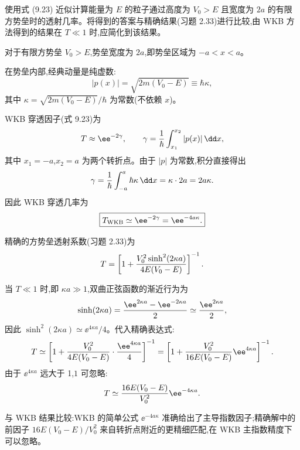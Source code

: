 \begin{question}
使用式 (9.23) 近似计算能量为 $E$ 的粒子通过高度为 $V_0>E$ 且宽度为 $2a$ 的有限方势垒时的透射几率。将得到的答案与精确结果(习题 2.33)进行比较,由 WKB 方法得到的结果在 $T\ll1$ 时,应简化到该结果。

\par\smallskip
{}

\begin{solution}
对于有限方势垒 $V_0>E$,势垒宽度为 $2a$,即势垒区域为 $-a<x<a$。

在势垒内部,经典动量是纯虚数:
\[
|p(x)|=\sqrt{2m(V_0-E)}\equiv\hbar\kappa,
\]
其中 $\kappa=\sqrt{2m(V_0-E)}/\hbar$ 为常数(不依赖 $x$)。

WKB 穿透因子(式 9.23)为
\[
T\approx \ee^{-2\gamma},
\qquad
\gamma={1\over\hbar}\int_{x_1}^{x_2}|p(x)|\,\dd x,
\]
其中 $x_1=-a$,$x_2=a$ 为两个转折点。由于 $|p|$ 为常数,积分直接得出
\[
\gamma={1\over\hbar}\int_{-a}^{a}\hbar\kappa\,\dd x
=\kappa\cdot 2a=2a\kappa.
\]
因此 WKB 穿透几率为
\[
\boxed{T_{\rm WKB}\simeq \ee^{-2\gamma}=\ee^{-4a\kappa}.}
\]

精确的方势垒透射系数(习题 2.33)为
\[
T=\left[1+{V_0^2\sinh^2(2\kappa a)\over4E(V_0-E)}\right]^{-1}.
\]

当 $T\ll1$ 时,即 $\kappa a\gg1$,双曲正弦函数的渐近行为为
\[
\sinh(2\kappa a)={\ee^{2\kappa a}-\ee^{-2\kappa a}\over2}
\simeq {\ee^{2\kappa a}\over2},
\]
因此 $\sinh^2(2\kappa a)\simeq \ee^{4\kappa a}/4$。代入精确表达式:
\[
T\simeq\left[1+{V_0^2\over4E(V_0-E)}\cdot{\ee^{4\kappa a}\over4}\right]^{-1}
=\left[1+{V_0^2\over16E(V_0-E)}\ee^{4\kappa a}\right]^{-1}.
\]
由于 $\ee^{4\kappa a}$ 远大于 1,$1$ 可忽略:
\[
T\simeq{16E(V_0-E)\over V_0^2}\ee^{-4\kappa a}.
\]

与 WKB 结果比较:WKB 的简单公式 $\ee^{-4a\kappa}$ 准确给出了主导指数因子;精确解中的前因子 $16E(V_0-E)/V_0^2$ 来自转折点附近的更精细匹配,在 WKB 主指数精度下可以忽略。
\end{solution}
\end{question}

